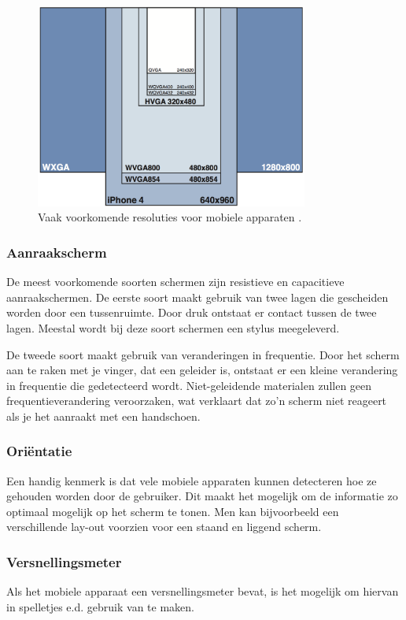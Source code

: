 \begin{figure}
  \centering
  \includegraphics[width=0.8\textwidth]{figuren/screen-resolutions.png}
  \caption{Vaak voorkomende resoluties voor mobiele apparaten \cite{PhilDutson2012}.}
  \label{fig:resoluties}
\end{figure}

\subsubsection{Aanraakscherm}
De meest voorkomende soorten schermen zijn resistieve en capacitieve aanraakschermen. De eerste soort maakt gebruik van twee lagen die gescheiden worden door een tussenruimte. Door druk ontstaat er contact tussen de twee lagen. Meestal wordt bij deze soort schermen een stylus meegeleverd. 

De tweede soort maakt gebruik van veranderingen in frequentie. Door het scherm aan te raken met je vinger, dat een geleider is, ontstaat er een kleine verandering in frequentie die gedetecteerd wordt. Niet-geleidende materialen zullen geen frequentieverandering veroorzaken, wat verklaart dat zo'n scherm niet reageert als je het aanraakt met een handschoen.

\subsubsection{Oriëntatie}
Een handig kenmerk is dat vele mobiele apparaten kunnen detecteren hoe ze gehouden worden door de gebruiker. Dit maakt het mogelijk om de informatie zo optimaal mogelijk op het scherm te tonen. Men kan bijvoorbeeld een verschillende lay-out voorzien voor een staand en liggend scherm.

\subsubsection{Versnellingsmeter}
Als het mobiele apparaat een versnellingsmeter bevat, is het mogelijk om hiervan in spelletjes e.d. gebruik van te maken.

